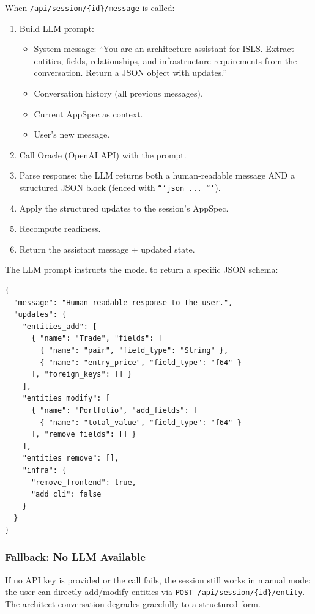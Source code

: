 \documentclass[11pt,a4paper]{article}
\begin{document}
When \texttt{/api/session/\{id\}/message} is called:

\begin{enumerate}[nosep]
\item Build LLM prompt:
      \begin{itemize}[nosep]
      \item System message: ``You are an architecture assistant for 
            ISLS. Extract entities, fields, relationships, and 
            infrastructure requirements from the conversation. 
            Return a JSON object with updates.''
      \item Conversation history (all previous messages).
      \item Current AppSpec as context.
      \item User's new message.
      \end{itemize}
\item Call Oracle (OpenAI API) with the prompt.
\item Parse response: the LLM returns both a human-readable 
      message AND a structured JSON block (fenced with 
      \texttt{```json ... ```}).
\item Apply the structured updates to the session's AppSpec.
\item Recompute readiness.
\item Return the assistant message + updated state.
\end{enumerate}

The LLM prompt instructs the model to return a specific JSON schema:

\begin{lstlisting}[style=json]
{
  "message": "Human-readable response to the user.",
  "updates": {
    "entities_add": [
      { "name": "Trade", "fields": [
        { "name": "pair", "field_type": "String" },
        { "name": "entry_price", "field_type": "f64" }
      ], "foreign_keys": [] }
    ],
    "entities_modify": [
      { "name": "Portfolio", "add_fields": [
        { "name": "total_value", "field_type": "f64" }
      ], "remove_fields": [] }
    ],
    "entities_remove": [],
    "infra": {
      "remove_frontend": true,
      "add_cli": false
    }
  }
}
\end{lstlisting}

\subsubsection{Fallback: No LLM Available}

If no API key is provided or the call fails, the session still 
works in manual mode: the user can directly add/modify entities 
via \texttt{POST /api/session/\{id\}/entity}. The architect 
conversation degrades gracefully to a structured form.
\end{document}
